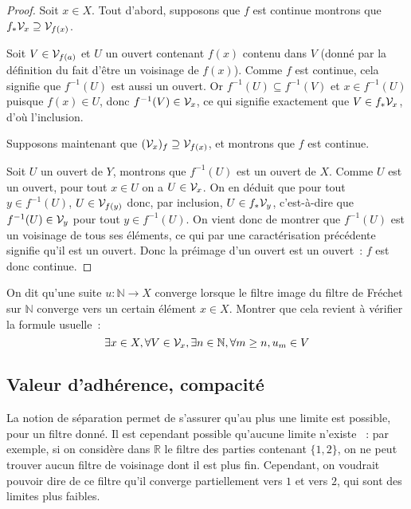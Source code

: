 \begin{proof}
  Soit $x \in X$. Tout d'abord, supposons que $f$ est continue montrons que
  $f_*\mathcal{V}_x \supseteq \mathcal{V}_{f(x)}$.

  Soit $V\in\mathcal{V}_{f(a)}$ et $U$ un ouvert contenant $f(x)$ contenu dans $V$
  (donné par la définition du fait d'être un voisinage de $f(x)$).
  Comme $f$ est continue, cela signifie que $f^{-1}(U)$ est aussi un ouvert. Or
  $f^{-1}(U)\subseteq f^{-1}(V)$ et $x\in f^{-1}(U)$ puisque $f(x)\in U$, donc
  $f^{-1}(V)\in\mathcal{V}_x$, ce qui signifie exactement que $V\in f_*\mathcal{V}_x$, d'où
  l'inclusion.

  Supposons maintenant que $(\mathcal{V}_x)_f\supseteq \mathcal{V}_{f(x)}$, et montrons que
  $f$ est continue.

  Soit $U$ un ouvert de $Y$, montrons que $f^{-1}(U)$ est un ouvert de $X$.
  Comme $U$ est un ouvert, pour tout $x\in U$ on a $U\in\mathcal{V}_x$. On en
  déduit que pour tout $y\in f^{-1}(U)$, $U\in\mathcal{V}_{f(y)}$ donc, par inclusion,
  $U\in f_*\mathcal{V}_y$, c'est-à-dire que $f^{-1}(U)\in\mathcal{V}_y$ pour tout
  $y\in f^{-1}(U)$. On vient donc de montrer que $f^{-1}(U)$ est un voisinage de
  tous ses éléments, ce qui par une caractérisation précédente signifie qu'il
  est un ouvert. Donc la préimage d'un ouvert est un ouvert~: $f$ est donc
  continue.
\end{proof}

\begin{exercise}\label{exo.conv.suite}
  On dit qu'une suite $u : \mathbb N \to X$ converge lorsque le filtre image du
  filtre de Fréchet sur $\mathbb N$ converge vers un certain élément $x\in X$.
  Montrer que cela revient à vérifier la formule usuelle~:
  \[\exists x\in X,\forall V\in\mathcal{V}_x, \exists n \in \mathbb N,
  \forall m \geq n, u_m \in V\]
\end{exercise}

\subsection{Valeur d'adhérence, compacité}

La notion de séparation permet de s'assurer qu'au plus une limite est possible,
pour un filtre donné. Il est cependant possible qu'aucune limite n'existe~ : par
exemple, si on considère dans $\mathbb R$ le filtre des parties contenant
$\{1,2\}$, on ne peut trouver aucun filtre de voisinage dont il est plus fin.
Cependant, on voudrait pouvoir dire de ce filtre qu'il converge partiellement
vers $1$ et vers $2$, qui sont des limites plus faibles.

